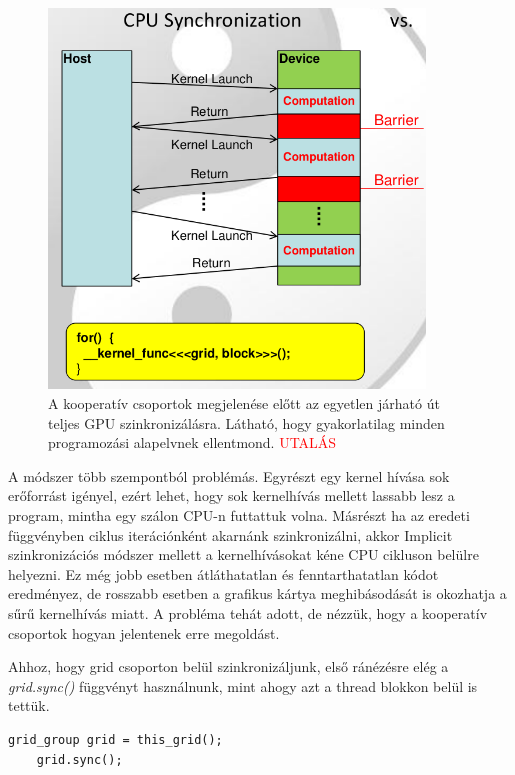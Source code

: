 \begin{figure}[ht!]
	\centering
	
	\includegraphics[width=100mm, keepaspectratio]{figures/Implicit synchronization.png}
	\caption{A kooperatív csoportok megjelenése előtt az egyetlen járható út teljes GPU szinkronizálásra. Látható, hogy gyakorlatilag minden programozási alapelvnek ellentmond. \textcolor{red}{UTALÁS}}
	\label{fig:Implicitsync}
\end{figure}


A módszer több szempontból problémás. Egyrészt egy kernel hívása sok erőforrást igényel, ezért lehet, hogy sok kernelhívás mellett lassabb lesz a program, mintha egy szálon CPU-n futtattuk volna. Másrészt ha az eredeti függvényben ciklus iterációnként akarnánk szinkronizálni, akkor Implicit szinkronizációs módszer mellett a kernelhívásokat kéne CPU cikluson belülre helyezni. Ez még jobb esetben átláthatatlan és fenntarthatatlan kódot eredményez, de rosszabb esetben a grafikus kártya meghibásodását is okozhatja a sűrű kernelhívás miatt. A probléma tehát adott, de nézzük, hogy a kooperatív csoportok hogyan jelentenek erre megoldást.

Ahhoz, hogy grid csoporton belül szinkronizáljunk, első ránézésre elég a \textit{grid.sync()} függvényt használnunk, mint ahogy azt a thread blokkon belül is tettük.

\begin{lstlisting}[style=CStyle]
	grid_group grid = this_grid();
	grid.sync();
\end{lstlisting}

